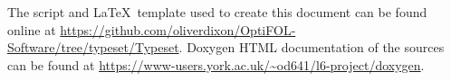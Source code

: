 \documentclass{article}
\newif\iffrontmatter
\begin{document}
The script and \LaTeX\ template used to create this document can be found online
at \url{https://github.com/oliverdixon/OptiFOL-Software/tree/typeset/Typeset}.
Doxygen HTML documentation of the sources can be found at
\url{https://www-users.york.ac.uk/~od641/l6-project/doxygen}.

\begin{center}
\end{center}
\endgroup

\tableofcontents
\clearpage
\frontmatterfalse
{}

\end{document}
